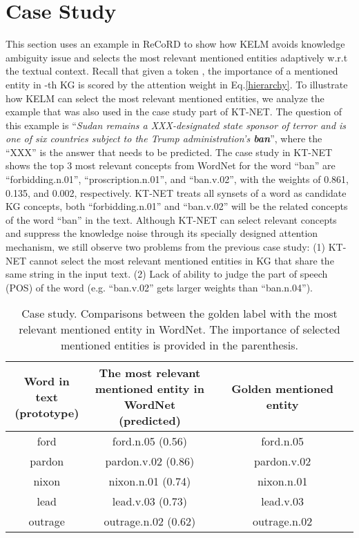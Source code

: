 \documentclass{article} \usepackage{iclr2022_conference,times}
\begin{document}
\section{Case Study}
This section uses an example in ReCoRD to show how KELM avoids knowledge ambiguity issue and selects the most relevant mentioned entities adaptively w.r.t the textual context. Recall that given a token , the importance of a mentioned entity  in -th KG is scored by the attention weight  in Eq.\ref{hierarchy}. To illustrate how KELM can select the most relevant mentioned entities, we analyze the example that was also used in the case study part of KT-NET. The question of this example is ``\textit{Sudan remains a XXX-designated state sponsor of terror and is one of six countries subject to the Trump administration’s \textbf{ban}}'', where the ``XXX'' is the answer that needs to be predicted. The case study in KT-NET shows the top 3 most relevant concepts from WordNet for the word ``ban'' are ``forbidding.n.01'', ``proscription.n.01'', and ``ban.v.02'', with the weights of 0.861, 0.135, and 0.002, respectively. KT-NET treats all synsets of a word as candidate KG concepts, both ``forbidding.n.01'' and ``ban.v.02'' will be the related concepts of the word ``ban'' in the text. Although KT-NET can select relevant concepts and suppress the knowledge noise through its specially designed attention mechanism, we still observe two problems from the previous case study: (1) KT-NET cannot select the most relevant mentioned entities in KG that share the same string in the input text. (2) Lack of ability to judge the part of speech (POS) of the word (e.g. ``ban.v.02'' gets larger weights than ``ban.n.04'').

\begin{wraptable}{r}{8.3cm}
\setlength{\belowcaptionskip}{-6mm}
\centering
\scriptsize
 \begin{tabular}{ccc}
  \toprule
  \makecell[c]{\textbf{Word in text}\\\textbf{(prototype)}} & \makecell[c]{\textbf{The most relevant}\\ \textbf{mentioned entity in}\\ \textbf{WordNet (predicted)}} & \textbf{Golden mentioned entity}\\ \hline
ford &  ford.n.05 (0.56)	&  ford.n.05	\\ \hline
  pardon &  pardon.v.02 (0.86)	& pardon.v.02	\\ \hline
  nixon &  nixon.n.01 (0.74) & nixon.n.01	\\ \hline
  lead &  lead.v.03 (0.73) & lead.v.03		\\ \hline
  outrage &  outrage.n.02 (0.62) & outrage.n.02 	\\ 
\bottomrule
\end{tabular}
\caption{Case study. Comparisons between the golden label with the most relevant mentioned entity in WordNet. The importance of selected mentioned entities is provided in the parenthesis.}
\label{case study v2}
\end{wraptable}
\end{document}
